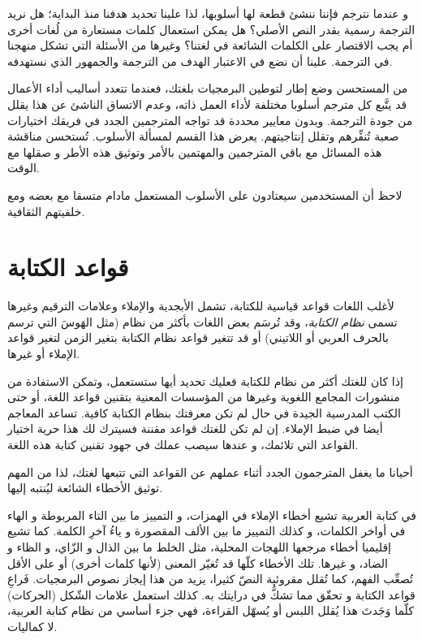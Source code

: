 و عندما نترجم فإننا ننشئ قطعة لها أسلوبها، لذا علينا تحديد هدفنا منذ
البداية؛ هل نريد الترجمة رسمية بقدر النص الأصلي؟ هل يمكن استعمال كلمات
مستعارة من لُغات أخرى أم يجب الاقتصار على الكلمات الشائعة في لغتنا؟
وغيرها من الأسئلة التي تشكل منهجنا في الترجمة. علينا أن نضع في الاعتبار
الهدف من الترجمة والجمهور الذي نستهدفه.

من المستحسن وضع إطار لتوطين البرمجيات بلغتك، فعندما تتعدد أساليب أداء
الأعمال قد يتَّبع كل مترجم أسلوبا مختلفة لأداء العمل ذاته، وعدم الاتساق
الناشئ عن هذا يقلل من جودة الترجمة. وبدون معايير محددة قد تواجه
المترجمين الجدد في فريقك اختيارات صعبة تُنفِّرهم وتقلل إنتاجيتهم. يعرض
هذا القسم لمسألة الأسلوب. تُستحسن مناقشة هذه المسائل مع باقي المترجمين
والمهتمين بالأمر وتوثيق هذه الأطر و صقلها مع الوقت.

لاحظ أن المستخدمين سيعتادون على الأسلوب المستعمل مادام متسقا مع بعضه ومع
خلفيتهم الثقافية.

\section{قواعد الكتابة}
لأغلب اللغات قواعد قياسية للكتابة، تشمل الأبجدية والإملاء وعلامات
الترقيم وغيرها تسمى {\it نظام الكتابة}، وقد تُرسَم بعض اللغات بأكثر من
نظام (مثل الهَوسَ التي ترسم بالحرف العربي أو اللاتيني) أو قد تتغير
قواعد نظام الكتابة بتغير الزمن لتغير قواعد الإملاء أو غيرها.

إذا كان للغتك أكثر من نظام للكتابة فعليك تحديد أيها ستستعمل، وتمكن
الاستفادة من منشورات المجامع اللغوية وغيرها من المؤسسات المعنية بتقنين
قواعد اللغة، أو حتى الكتب المدرسية الجيدة في حال لم تكن معرفتك بنظام
الكتابة كافية. تساعد المعاجم أيضا في ضبط الإملاء. إن لم تكن للغتك قواعد
مقننة فسيترك لك هذا حرية اختيار القواعد التي تلائمك، و عندها سيصب عملك
في جهود تقنين كتابة هذه اللغة.

أحيانا ما يغفل المترجمون الجدد أثناء عملهم عن القواعد التي تتبعها لغتك،
لذا من المهم توثيق الأخطاء الشائعة ليُنتبه إليها.

في كتابة العربية تشيع أخطاء الإملاء في الهمزات، و التمييز ما بين التاء
المربوطة و الهاء في أواخر الكلمات، و كذلك التمييز ما بين الألف المقصورة
و ياءُ آخرِ الكلمة. كما تشيع إقليميا أخطاء مرجعها اللهجات المحلية، مثل
الخلط ما بين الذال و الزّاي، و الظاء و الضاد، و غيرها. تلك الأخطاء
كلّها قد تُغيّر المعنى (لأنها كلمات أخرى) أو على الأقل تُصعِّب الفهم،
كما تُقلل مقروئية النصّ كثيرا، يزيد من هذا إيجاز نصوص البرمجيات. فَراعِ
قواعد الكتابة و تحقّق مما تشكُّ في درايتك به. كذلك استعمل علامات الشّكل
(الحركات) كلّما وَجَدتَ هذا يُقلل اللبس أو يُسهّل القراءة، فهي جزء
أساسي من نظام كتابة العربية، لا كماليات.

